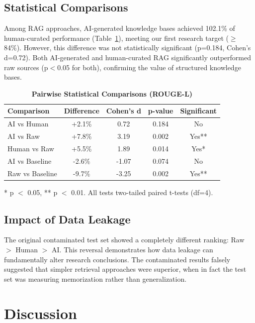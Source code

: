 \documentclass[10pt,letterpaper]{article}
\begin{document}
\subsection*{Statistical Comparisons}
Among RAG approaches, AI-generated knowledge bases achieved 102.1\% of human-curated performance (Table~\ref{tab:statistical}), meeting our first research target ($\geq$84\%). However, this difference was not statistically significant (p=0.184, Cohen's d=0.72). Both AI-generated and human-curated RAG significantly outperformed raw sources (p$<$0.05 for both), confirming the value of structured knowledge bases.

\begin{table}[h!]
\centering
\caption{\bf Pairwise Statistical Comparisons (ROUGE-L)}
\begin{tabular}{lcccc}
\toprule
\textbf{Comparison} & \textbf{Difference} & \textbf{Cohen's d} & \textbf{p-value} & \textbf{Significant} \\
\midrule
AI vs Human & +2.1\% & 0.72 & 0.184 & No \\
AI vs Raw & +7.8\% & 3.19 & 0.002 & Yes** \\
Human vs Raw & +5.5\% & 1.89 & 0.014 & Yes* \\
AI vs Baseline & -2.6\% & -1.07 & 0.074 & No \\
Raw vs Baseline & -9.7\% & -3.25 & 0.002 & Yes** \\
\bottomrule
\end{tabular}
\begin{flushleft}
* p $<$ 0.05, ** p $<$ 0.01. All tests two-tailed paired t-tests (df=4).
\end{flushleft}
\label{tab:statistical}
\end{table}

\subsection*{Impact of Data Leakage}
The original contaminated test set showed a completely different ranking: Raw $>$ Human $>$ AI. This reversal demonstrates how data leakage can fundamentally alter research conclusions. The contaminated results falsely suggested that simpler retrieval approaches were superior, when in fact the test set was measuring memorization rather than generalization.

\section*{Discussion}
\end{document}
